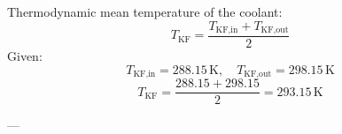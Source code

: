Thermodynamic mean temperature of the coolant:  
\[
T_{\text{KF}} = \frac{T_{\text{KF,in}} + T_{\text{KF,out}}}{2}
\]  
Given:  
\[
T_{\text{KF,in}} = 288.15 \, \text{K}, \quad T_{\text{KF,out}} = 298.15 \, \text{K}
\]  
\[
T_{\text{KF}} = \frac{288.15 + 298.15}{2} = 293.15 \, \text{K}
\]  

---